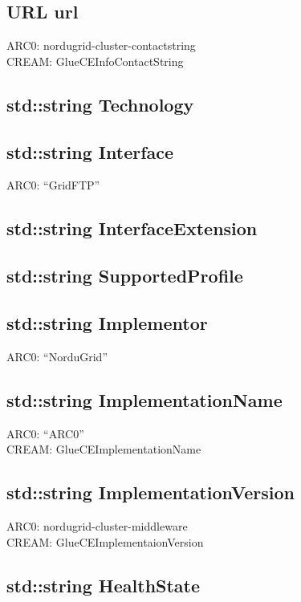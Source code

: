 \documentclass{book}
\begin{document}
\subsection*{URL url}

ARC0: nordugrid-cluster-contactstring \\
CREAM: GlueCEInfoContactString

\subsection*{std::string Technology}

\subsection*{std::string Interface}

ARC0: ``GridFTP''

\subsection*{std::string InterfaceExtension}

\subsection*{std::string SupportedProfile}

\subsection*{std::string Implementor}

ARC0: ``NorduGrid''

\subsection*{std::string ImplementationName}

ARC0: ``ARC0'' \\
CREAM: GlueCEImplementationName

\subsection*{std::string ImplementationVersion}

ARC0: nordugrid-cluster-middleware \\
CREAM: GlueCEImplementaionVersion

\subsection*{std::string HealthState}
\end{document}
